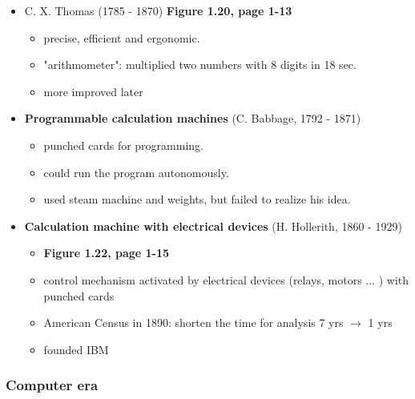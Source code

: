 \documentclass{standalone}
\begin{document}
\begin{itemize}
	\item C. X. Thomas (1785 - 1870) \textbf{Figure 1.20, page 1-13}
		\begin{itemize}
			\item precise, efficient and ergonomic.
			\item "arithmometer": multiplied two numbers with 8 digits in 18 sec.
			\item more improved later 	
		\end{itemize}
	\item \textbf{Programmable calculation machines} (C. Babbage, 1792 - 1871)
		\begin{itemize}
			\item punched cards for programming. 
			\item could run the program autonomously.
			\item used steam machine and weights, but failed to realize his idea. 
		\end{itemize}
	\item \textbf{Calculation machine with electrical devices} (H. Hollerith, 1860 - 1929)
		\begin{itemize}
			\item \textbf{Figure 1.22, page 1-15}
			\item control mechanism activated by electrical devices (relays, motors ... ) with punched cards
			\item American Census in 1890: shorten the time for analysis 7 yrs $\rightarrow$ 1 yrs
			\item founded IBM
		\end{itemize}
\end{itemize}

\subsubsection*{Computer era}
\end{document}

